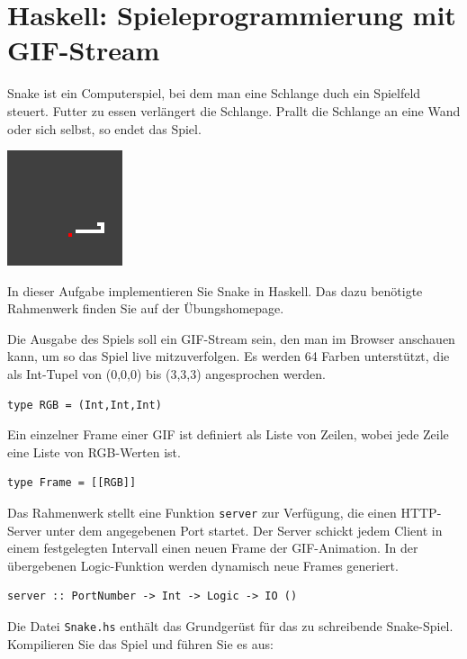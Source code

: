 \documentclass{scrartcl}
\begin{document}
\section{Haskell: Spieleprogrammierung mit GIF-Stream}

Snake ist ein Computerspiel, bei dem man eine Schlange duch ein Spielfeld steuert.
Futter zu essen verlängert die Schlange.
Prallt die Schlange an eine Wand oder sich selbst, so endet das Spiel.

\begin{center}
\includegraphics{snake}
\end{center}

In dieser Aufgabe implementieren Sie Snake in Haskell.
Das dazu benötigte Rahmenwerk finden Sie auf der Übungshomepage.

Die Ausgabe des Spiels soll ein GIF-Stream sein, den man im Browser anschauen kann, um so das Spiel live mitzuverfolgen.
Es werden 64 Farben unterstützt, die als Int-Tupel von (0,0,0) bis (3,3,3) angesprochen werden.

\begin{lstlisting}
type RGB = (Int,Int,Int)
\end{lstlisting}

Ein einzelner Frame einer GIF ist definiert als Liste von Zeilen, wobei jede Zeile eine Liste von RGB-Werten ist.

\begin{lstlisting}
type Frame = [[RGB]]
\end{lstlisting}

Das Rahmenwerk stellt eine Funktion \texttt{server} zur Verfügung, die einen HTTP-Server unter dem angegebenen Port startet.
Der Server schickt jedem Client in einem festgelegten Intervall einen neuen Frame der GIF-Animation.
In der übergebenen Logic-Funktion werden dynamisch neue Frames generiert.

\begin{lstlisting}
server :: PortNumber -> Int -> Logic -> IO ()
\end{lstlisting}

Die Datei \texttt{Snake.hs} enthält das Grundgerüst für das zu schreibende Snake-Spiel.
Kompilieren Sie das Spiel und führen Sie es aus:
\end{document}
